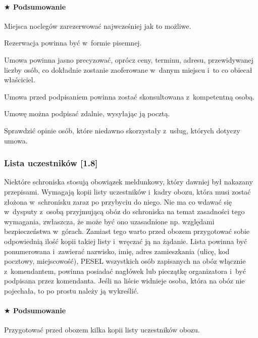 \documentclass[a5paper,10pt,titlepage,twoside]{article}
\newcommand*{\thecheckbox}{\hss$\Box$} %
\newenvironment*{checklist}
{\list{}{%
\renewcommand*{\makelabel}[1]{\thecheckbox}}}
{\endlist}
\begin{document}
\paragraph{$\bigstar$ Podsumowanie}
\begin{checklist}
\item Miejsca noclegów zarezerwować najwcześniej jak to możliwe.
\item Rezerwacja powinna być w~formie pisemnej.
\item Umowa powinna jasno precyzować, oprócz ceny, terminu, adresu, przewidywanej liczby osób, co dokładnie zostanie zaoferowane w~danym miejscu i~to co obiecał właściciel.
\item Umowa przed podpisaniem powinna zostać skonsultowana z~kompetentną osobą.
\item Umowę można podpisać zdalnie, wysyłając ją pocztą.
\item Sprawdzić opinie osób, które niedawno skorzystały z~usług, których dotyczy umowa.
\end{checklist}

\subsubsection{Lista uczestników [1.8]}
Niektóre schroniska stosują obowiązek meldunkowy, który dawniej był nakazany przepisami. Wymagają kopii listy uczestników i~kadry obozu, która musi zostać złożona w~schronisku zaraz po przybyciu do niego. Nie ma co wdawać się w~dysputy z~osobą przyjmującą obóz do schroniska na temat zasadności tego wymagania, zwłaszcza, że może być ono uzasadnione np. względami bezpieczeństwa w~górach. Zamiast tego warto przed obozem przygotować sobie odpowiednią ilość kopii takiej listy i~wręczać ją na żądanie. Lista powinna być ponumerowana i~zawierać nazwisko, imię, adres zamieszkania (ulicę, kod pocztowy, miejscowość), PESEL wszystkich osób zapisanych na obóz włącznie z~komendantem, powinna posiadać nagłówek lub pieczątkę organizatora i~być podpisana przez komendanta. Jeśli na liście widnieje osoba, która na obóz nie pojechała, to po prostu należy ją wykreślić.

\paragraph{$\bigstar$ Podsumowanie}
\begin{checklist}
\item Przygotować przed obozem kilka kopii listy uczestników obozu.
\end{checklist}
\end{document}
